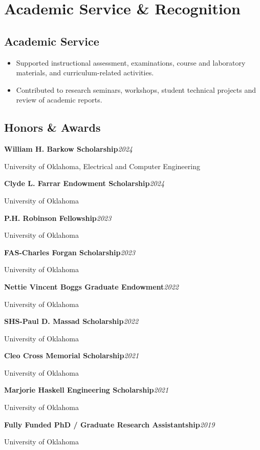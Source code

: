 \documentclass[9pt,letterpaper]{extarticle}
\newcommand{\entry}[2]{\Needspace{4\baselineskip}\textbf{#1}\hfill\textit{#2}\par}
\begin{document}
\section{Academic Service \& Recognition}
\subsection{Academic Service}
\begin{itemize}
\item Supported instructional assessment, examinations, course and laboratory materials, and curriculum-related activities.
\item Contributed to research seminars, workshops, student technical projects and review of academic reports.
\end{itemize}
\subsection{Honors \& Awards}
\entry{William H. Barkow Scholarship}{2024}
{\small University of Oklahoma, Electrical and Computer Engineering\par}
\entry{Clyde L. Farrar Endowment Scholarship}{2024}
{\small University of Oklahoma\par}
\entry{P.H. Robinson Fellowship}{2023}
{\small University of Oklahoma\par}
\entry{FAS-Charles Forgan Scholarship}{2023}
{\small University of Oklahoma\par}
\entry{Nettie Vincent Boggs Graduate Endowment}{2022}
{\small University of Oklahoma\par}
\entry{SHS-Paul D. Massad Scholarship}{2022}
{\small University of Oklahoma\par}
\entry{Cleo Cross Memorial Scholarship}{2021}
{\small University of Oklahoma\par}
\entry{Marjorie Haskell Engineering Scholarship}{2021}
{\small University of Oklahoma\par}
\entry{Fully Funded PhD / Graduate Research Assistantship}{2019}
{\small University of Oklahoma\par}
\end{document}
